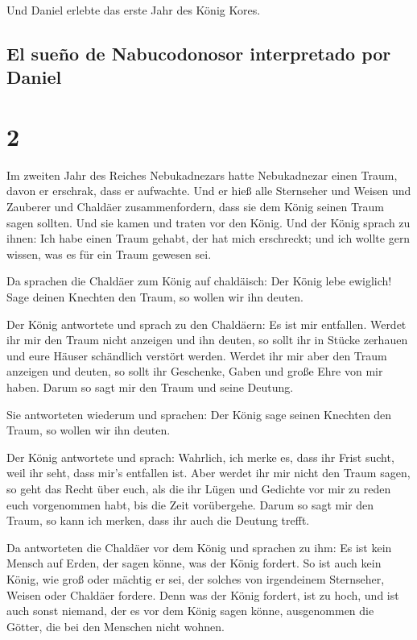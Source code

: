 Und Daniel erlebte das erste Jahr des König Kores.

\hypertarget{el-sueuxf1o-de-nabucodonosor-interpretado-por-daniel}{%
\subsection{El sueño de Nabucodonosor interpretado por
Daniel}\label{el-sueuxf1o-de-nabucodonosor-interpretado-por-daniel}}

\hypertarget{section-1}{%
\section{2}\label{section-1}}

 Im zweiten Jahr des Reiches Nebukadnezars hatte
Nebukadnezar einen Traum, davon er erschrak, dass er aufwachte.
 Und er hieß alle Sternseher und Weisen und Zauberer und
Chaldäer zusammenfordern, dass sie dem König seinen Traum sagen sollten.
Und sie kamen und traten vor den König.  Und der König
sprach zu ihnen: Ich habe einen Traum gehabt, der hat mich erschreckt;
und ich wollte gern wissen, was es für ein Traum gewesen sei.

 Da sprachen die Chaldäer zum König auf chaldäisch: Der
König lebe ewiglich! Sage deinen Knechten den Traum, so wollen wir ihn
deuten.

 Der König antwortete und sprach zu den Chaldäern: Es ist
mir entfallen. Werdet ihr mir den Traum nicht anzeigen und ihn deuten,
so sollt ihr in Stücke zerhauen und eure Häuser schändlich verstört
werden.  Werdet ihr mir aber den Traum anzeigen und
deuten, so sollt ihr Geschenke, Gaben und große Ehre von mir haben.
Darum so sagt mir den Traum und seine Deutung.

 Sie antworteten wiederum und sprachen: Der König sage
seinen Knechten den Traum, so wollen wir ihn deuten.

 Der König antwortete und sprach: Wahrlich, ich merke es,
dass ihr Frist sucht, weil ihr seht, dass mir's entfallen ist.
 Aber werdet ihr mir nicht den Traum sagen, so geht das
Recht über euch, als die ihr Lügen und Gedichte vor mir zu reden euch
vorgenommen habt, bis die Zeit vorübergehe. Darum so sagt mir den Traum,
so kann ich merken, dass ihr auch die Deutung trefft.

 Da antworteten die Chaldäer vor dem König und sprachen
zu ihm: Es ist kein Mensch auf Erden, der sagen könne, was der König
fordert. So ist auch kein König, wie groß oder mächtig er sei, der
solches von irgendeinem Sternseher, Weisen oder Chaldäer fordere.
 Denn was der König fordert, ist zu hoch, und ist auch
sonst niemand, der es vor dem König sagen könne, ausgenommen die Götter,
die bei den Menschen nicht wohnen.

